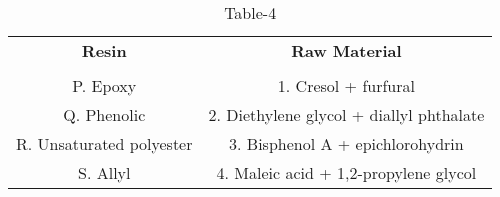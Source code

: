 \begin{table}[htbp]
  \centering
  \caption{Table-4}
  \label{table4}
  \begin{tabular}{cc}
  \textbf{Resin} & \textbf{Raw Material} \\ \\
    P. Epoxy & 1. Cresol + furfural \\
    Q. Phenolic & 2. Diethylene glycol + diallyl phthalate \\
    R. Unsaturated polyester & 3. Bisphenol A + epichlorohydrin \\
    S. Allyl & 4. Maleic acid + 1,2-propylene glycol \\
  \end{tabular}
\end{table}